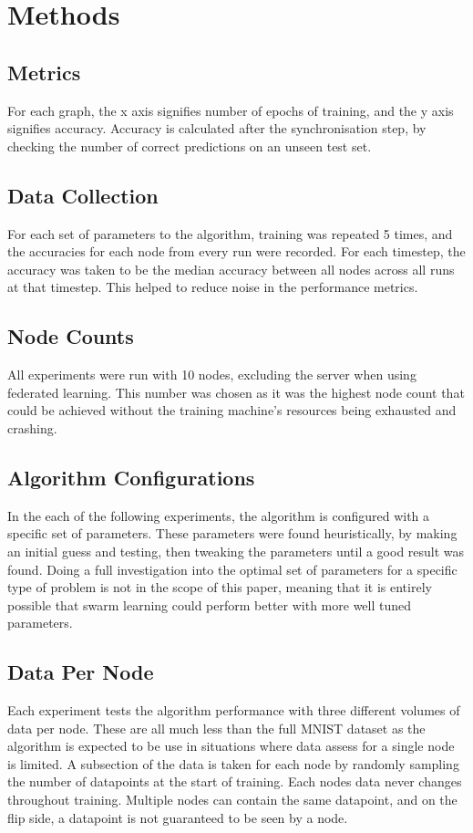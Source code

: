 \section{Methods}
\subsection{Metrics}
For each graph, the x axis signifies number of epochs of training, and the y axis signifies accuracy. Accuracy is calculated after the synchronisation step, by checking the number of correct predictions on an unseen test set.

\subsection{Data Collection}
For each set of parameters to the algorithm, training was repeated 5 times, and the accuracies for each node from every run were recorded. For each timestep, the accuracy was taken to be the median accuracy between all nodes across all runs at that timestep. This helped to reduce noise in the performance metrics.

\subsection{Node Counts}
All experiments were run with 10 nodes, excluding the server when using federated learning. This number was chosen as it was the highest node count that could be achieved without the training machine's resources being exhausted and crashing.

\subsection{Algorithm Configurations}
In the each of the following experiments, the algorithm is configured with a specific set of parameters. These parameters were found heuristically, by making an initial guess and testing, then tweaking the parameters until a good result was found. Doing a full investigation into the optimal set of parameters for a specific type of problem is not in the scope of this paper, meaning that it is entirely possible that swarm learning could perform better with more well tuned parameters.

\subsection{Data Per Node}
Each experiment tests the algorithm performance with three different volumes of data per node. These are all much less than the full MNIST dataset as the algorithm is expected to be use in situations where data assess for a single node is limited. A subsection of the data is taken for each node by randomly sampling the number of datapoints at the start of training. Each nodes data never changes throughout training. Multiple nodes can contain the same datapoint, and on the flip side, a datapoint is not guaranteed to be seen by a node.

